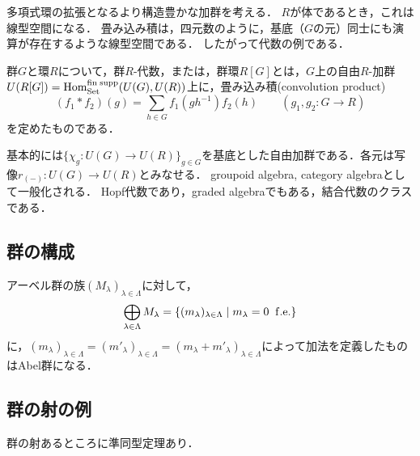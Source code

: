 \documentclass[uplatex,dvipdfmx]{jsreport}
\begin{document}
\begin{tcolorbox}[colframe=ForestGreen, colback=ForestGreen!10!white,breakable,colbacktitle=ForestGreen!40!white,coltitle=black,fonttitle=\bfseries\sffamily,
title=]
    多項式環の拡張となるより構造豊かな加群を考える．
    $R$が体であるとき，これは線型空間になる．
    畳み込み積は，四元数のように，基底（$G$の元）同士にも演算が存在するような線型空間である．
    したがって代数の例である．
\end{tcolorbox}

\begin{definition}
    群$G$と環$R$について，群$R$-代数，または，群環$R[G]$とは，$G$上の自由$R$-加群$U(R[G])=\mathrm{Hom}^{\mathrm{fin\;supp}}_{\mathrm{Set}}(U(G),U(R))$上に，畳み込み積(convolution product)
    \[(f_1*f_2)(g)=\sum_{h\in G}f_1(gh^{-1})f_2(h)\qquad(g_1,g_2:G\to R)\]
    を定めたものである．
\end{definition}
\begin{remark}
    基本的には$\{\chi_g:U(G)\to U(R)\}_{g\in G}$を基底とした自由加群である．各元は写像$r_{(-)}:U(G)\to U(R)$とみなせる．
    groupoid algebra, category algebraとして一般化される．
    Hopf代数であり，graded algebraでもある，結合代数のクラスである．
\end{remark}

\subsection{群の構成}

\begin{definition}
    アーベル群の族$(M_\lambda)_{\lambda\in\Lambda}$に対して，
    \[\bigoplus_{\lambda\in\Lambda}M_\lambda=\left\{(m_\lambda)_{\lambda\in\Lambda}\;\middle|\;m_\lambda=0\;\;\mathrm{f.e.}\right\}\]
    に，$(m_\lambda)_{\lambda\in\Lambda}=(m'_\lambda)_{\lambda\in\Lambda}=(m_\lambda+m'_\lambda)_{\lambda\in\Lambda}$によって加法を定義したものはAbel群になる．
\end{definition}

\subsection{群の射の例}

\begin{tcolorbox}[colframe=ForestGreen, colback=ForestGreen!10!white,breakable,colbacktitle=ForestGreen!40!white,coltitle=black,fonttitle=\bfseries\sffamily,
title=]
    群の射あるところに準同型定理あり．
\end{tcolorbox}
\end{document}
